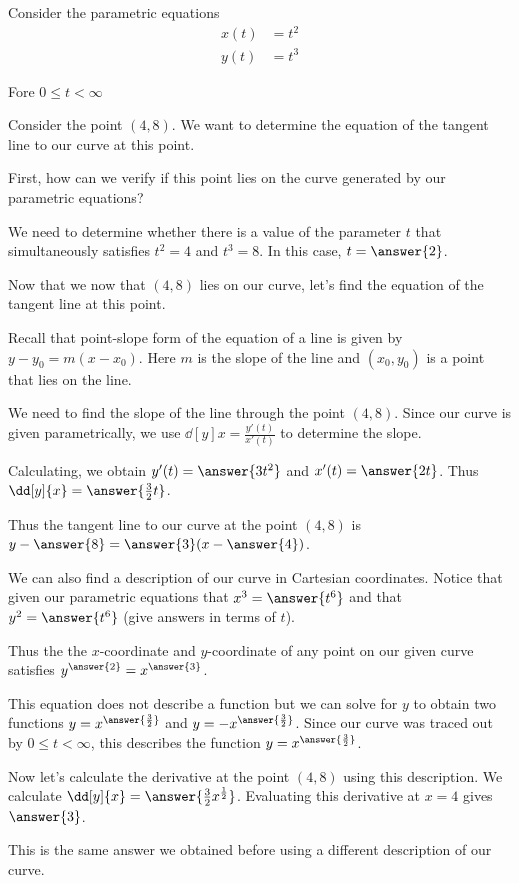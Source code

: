 \documentclass{ximera}
\author{Jim Talamo}
\begin{document}
\begin{exercise}
Consider the parametric equations 
\begin{align*}
x(t) &= t^2\\
y(t) &= t^3
\end{align*}

Fore $0\leq t < \infty$


Consider the point $(4,8)$. We want to determine the equation of the tangent line to our curve at this point. 

First, how can we verify if this point lies on the curve generated by our parametric equations? 

We need to determine whether there is a value of the parameter $t$
that simultaneously satisfies $t^2=4$ and $t^3=8$. 
In this case, $t=\answer{2}$. 

Now that we now that $(4,8)$ lies on our curve, let's find the equation of the tangent line at this point. 

Recall that point-slope form of the equation of a line is given by $y-y_{0}=m(x-x_{0})$. Here $m$ is the slope of the line and $(x_{0}, y_{0})$ is a point that lies on the line. 

We need to find the slope of the line through the point $(4,8)$. Since our curve is given parametrically, we use $\dd[y]{x}=\frac{y'(t)}{x'(t)}$ to determine the slope. 

Calculating, we obtain $y'(t)=\answer{3t^2}$ and $x'(t)=\answer{2t}$. Thus $\dd[y]{x}=\answer{\frac{3}{2}t}$. 

Thus the tangent line to our curve at the point $(4, 8)$ is $y-\answer{8}=\answer{3}(x-\answer{4})$. 

\begin{exercise}

We can also find a description of our curve in Cartesian coordinates. Notice that given our parametric equations that $x^3=\answer{t^6}$ and that $y^2=\answer{t^6}$ (give answers in terms of $t$).

Thus the the $x$-coordinate and $y$-coordinate of any point on our given curve satisfies $y^{\answer{2}}=x^{\answer{3}}$. 

This equation does not describe a function but we can solve for $y$ to obtain two functions $y=x^{\answer{\frac{3}{2}}}$ and $y=-x^{\answer{\frac{3}{2}}}$. Since our curve was traced out by $0\leq t < \infty$, this describes the function $y=x^{\answer{\frac{3}{2}}}$. 

Now let's calculate the derivative at the point $(4,8)$ using this description. We calculate $\dd[y]{x}=\answer{\frac{3}{2}x^{\frac{1}{2}}}$. 
Evaluating this derivative at $x=4$ gives $\answer{3}$.

This is the same answer we obtained before using a different description of our curve. 

\end{exercise}
\end{exercise}
\end{document}
